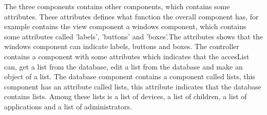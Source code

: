 The three components contains other components, which contains some attributes. These attributes defines what function the overall component has, for example contains the view component a windows component, which contains some attributes called 'labels', 'buttons' and 'boxes'.The attributes shows that the windows component can indicate labels, buttons and boxes.
The controller contains a component with some attributes which indicates that the accesList can, get a list from the database, edit a list from the database and make an object of a list.
The database component contains a component called lists, this component has an attribute called lists, this attribute indicates that the database contains lists. Among these lists is a list of devices, a list of children, a list of applications and a list of administrators.